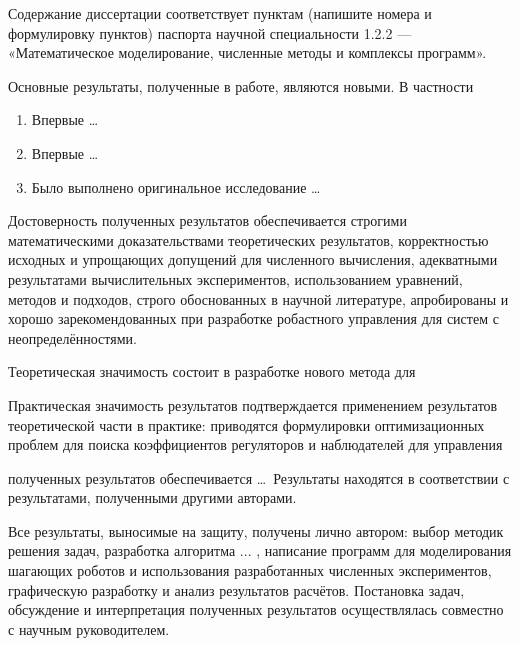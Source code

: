 {\compliances} 

Содержание диссертации соответствует пунктам (напишите номера и формулировку
пунктов) паспорта научной специальности 1.2.2 — «Математическое моделирование,
численные методы и комплексы программ».

{\novelty}

Основные результаты, полученные в работе, являются новыми. В частности
\begin{enumerate}[beginpenalty=10000] %
	\item Впервые \ldots
	\item Впервые \ldots
	\item Было выполнено оригинальное исследование \ldots
\end{enumerate}

{\probation}

Достоверность полученных результатов обеспечивается строгими математическими доказательствами теоретических результатов, корректностью исходных и упрощающих допущений для численного вычисления, адекватными результатами вычислительных экспериментов, использованием уравнений, методов и подходов, строго обоснованных в научной литературе, апробированы и хорошо зарекомендованных при разработке робастного управления для систем с неопределённостями. 

{\influence} 

Теоретическая значимость состоит в разработке нового метода для 

Практическая значимость результатов подтверждается применением результатов теоретической части в практике: приводятся формулировки оптимизационных проблем для поиска коэффициентов регуляторов и наблюдателей для управления

{\reliability} 

полученных результатов обеспечивается \ldots \ Результаты находятся в соответствии с результатами, полученными другими авторами.

{\contribution} 

Все результаты, выносимые на защиту, получены лично автором: выбор методик решения задач, разработка алгоритма ... , написание программ для моделирования шагающих роботов и использования разработанных численных экспериментов, графическую разработку и анализ результатов расчётов. Постановка задач, обсуждение и интерпретация полученных результатов осуществлялась совместно с научным руководителем.